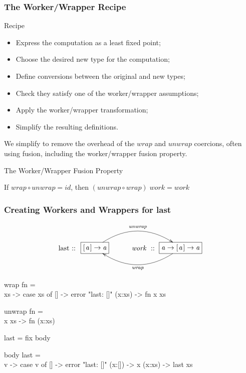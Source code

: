 \documentclass[smaller]{beamer}
\makeatletter
\newcommand{\Varid}[1]{\mathit{#1}}
\newcommand{\wrapunwrap}[3]
{$$\xymatrix@C=18pt@R=0pt{
        *[r]{\raisebox{-6pt}{#1\ ::\hspace*{-3pt}}}
      & *+[F-:]{#2} 
                \ar@/^2pc/[rr]^-{\ensuremath{\Varid{unwrap}}}
      & *[r]{\ensuremath{\Varid{work}}\ ::\ }
      & *+[F-:]{#3}="work"
                \ar@/^2pc/[ll]^-{\ensuremath{\Varid{wrap}}} 
}$$}
\makeatother
\begin{document}
\begin{frame}[fragile] 
\frametitle{The Worker/Wrapper Recipe}

\begin{block}{Recipe}
\begin{itemize}
\item Express the computation as a least fixed point;
\item Choose the desired new type for the computation;
\item Define conversions between the original and new types;
\item Check they satisfy one of the worker/wrapper assumptions;
\item Apply the worker/wrapper transformation;
\item Simplify the resulting definitions.
\end{itemize}
\end{block}

We simplify to remove the overhead of the \ensuremath{\Varid{wrap}} and \ensuremath{\Varid{unwrap}} coercions,
often using fusion, including the worker/wrapper fusion property.

\begin{block}{The Worker/Wrapper Fusion Property}
\begin{center}
If \ensuremath{\Varid{wrap}\mathbin{\circ}\Varid{unwrap}\mathrel{=}\Varid{id}}, then \ensuremath{(\Varid{unwrap}\mathbin{\circ}\Varid{wrap})\;\Varid{work}\mathrel{=}\Varid{work}}
\end{center}
\end{block}

\end{frame}

\begin{frame}[fragile] 
\frametitle{Creating Workers and Wrappers for last}

\wrapunwrap{last}{\ensuremath{[\mskip1.5mu \Varid{a}\mskip1.5mu]\to \Varid{a}}}{\ensuremath{\Varid{a}\to [\mskip1.5mu \Varid{a}\mskip1.5mu]\to \Varid{a}}}

\begin{semiverbatim}
wrap fn = \\ xs -> case xs of
                    [] -> error "last: []"
                    (x:xs) -> fn x xs

unwrap fn = \\ x xs -> fn (x:xs)

last = fix body

body last = \\ v -> case v of
                     []     -> error "last: []"
                     (x:[]) -> x
                     (x:xs) -> last xs
\end{semiverbatim}
\end{frame}
\end{document}
